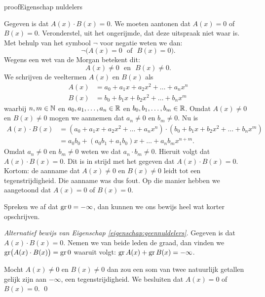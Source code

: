 \documentclass{ximera}
\begin{document}
\begin{expandable}{proof}{Eigenschap nuldelers}

Gegeven is dat $A(x)\cdot B(x) = 0$. We moeten aantonen dat $A(x) = 0$ of $B(x) = 0$. Veronderstel, uit het ongerijmde, dat deze uitspraak niet waar is. Met behulp van het symbool $\neg$ voor 
negatie weten we dan:
\[
\neg\bigl(A(x) = 0 \,\, \text{ of } \,\, B(x) = 0\bigr).
\]
Wegens een wet van de Morgan betekent dit:
\[
A(x) \neq 0 \,\, \text{ en } \,\, B(x) \neq 0.
\] 
We schrijven de veeltermen $A(x)$ en $B(x)$ als
\begin{align*}
A(x) & = a_0 + a_1 x + a_2 x^2 + \dots + a_n x^n \\
B(x) & = b_0 + b_1 x + b_2 x^2 + \dots + b_n x^m
\end{align*}
waarbij $n,m \in \mathbb{N}$ en $a_0, a_1, \ldots, a_n \in \mathbb{R}$ en $b_0, b_1, \ldots, b_m \in \mathbb{R}$. Omdat $A(x) \neq 0$ en $B(x) \neq 0$ mogen we aannemen dat $a_n \neq 0$ en $b_m \neq 0$. Nu is
\begin{align*}
A(x) \cdot B(x) 
& = \left(a_0 + a_1 x + a_2 x^2 + \dots + a_n x^n\right) \cdot \left( b_0 + b_1 x + b_2 x^2 + \dots + b_n x^m\right) \\
& = a_0b_0 + (a_0b_1 + a_1b_0)x + \dots + a_n b_m x^{n+m}.
\end{align*}
Omdat $a_n \neq 0$ en $b_m \neq 0$ weten we dat $a_n \cdot b_m \neq 0$. Hieruit volgt dat $A(x) \cdot B(x) = 0$. Dit is in strijd met het gegeven dat $A(x)\cdot B(x) = 0$. Kortom: de aanname dat $A(x) \neq 0$ en $B(x) \neq 0$ leidt tot een tegenstrijdigheid. Die aanname was dus fout. Op die manier hebben we aangetoond dat $A(x) = 0$ of $B(x) = 0$. 

\end{expandable}


\begin{xmuitweiding}
Spreken we af dat $\operatorname{gr} 0 = - \infty$, dan kunnen we ons bewijs heel wat korter opschrijven. 

\textit{ Alternatief bewijs van Eigenschap \ref{eigenschap:geennuldelers}.}
Gegeven is dat $A(x)\cdot B(x) = 0$. Nemen we van beide leden de graad, dan vinden we $\operatorname{gr}\bigl( A(x)\cdot B(x) \bigr) = \operatorname{gr} 0$ waaruit volgt: $\operatorname{gr} A(x) + \operatorname{gr} B(x) = - \infty$.

Mocht $A(x) \neq 0$ en $B(x) \neq 0$ dan zou een som van twee natuurlijk getallen gelijk zijn aan $-\infty$, een tegenstrijdigheid. We besluiten dat $A(x) = 0$ of $B(x) = 0$.
\qed

\end{xmuitweiding}
\end{document}
